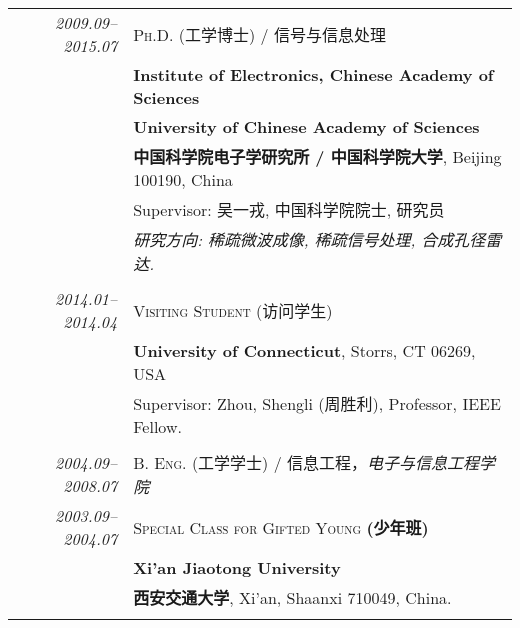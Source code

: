 \documentclass[paper=a4,fontsize=11pt]{scrartcl}
\begin{document}
\begin{longtable}{r|p{12cm}}	
	\emph{2009.09--2015.07} & \textsc{Ph.D.} (工学博士) / \textsc{信号与信息处理} \\
	& \normalsize\textbf{Institute of Electronics, Chinese Academy of Sciences} \\
	& \normalsize\textbf{University of Chinese Academy of Sciences}\\
	& \normalsize\textbf{中国科学院电子学研究所 / 中国科学院大学}, Beijing 100190, China\\
	& Supervisor: 吴一戎, 中国科学院院士, 研究员 \\
	& \emph{研究方向: 稀疏微波成像, 稀疏信号处理, 合成孔径雷达.} \\
	\multicolumn{2}{c}{} \\
	
		\emph{2014.01--2014.04} & \textsc{Visiting Student} (访问学生)\\
	& \normalsize\textbf{University of Connecticut}, Storrs, CT 06269, USA\\
	& Supervisor: Zhou, Shengli (周胜利), Professor, IEEE Fellow. \\
	\multicolumn{2}{c}{} \\
	
%
	



	\emph{2004.09--2008.07} & \textsc{B. Eng.} (工学学士) \textsc{/ 信息工程}，\emph{电子与信息工程学院} \\
		\emph{2003.09--2004.07} & \textsc{Special Class for Gifted Young} \textbf{(少年班)} \\
	& \normalsize\textbf{Xi'an Jiaotong University} \\
	& \normalsize\textbf{西安交通大学}, Xi'an, Shaanxi 710049, China.\\
	\multicolumn{2}{c}{} 
%	
%	




\end{longtable}
\end{document}
